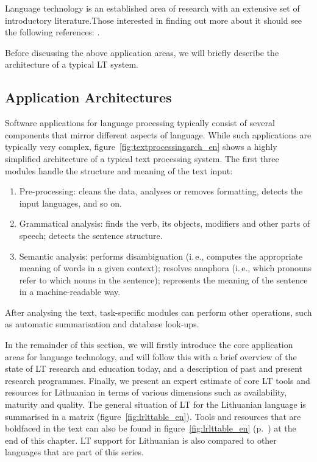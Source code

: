 \documentclass[]{../metanetpaper}
\begin{document}
\begin{multicols}{2}
Language technology is an established area of research with an extensive set of introductory literature.Those interested in finding out more about it should see the following references:  \cite{carstensen-etal1, jurafsky-martin01, manning-schuetze1, lt-world1, lt-survey1}.

Before discussing the above application areas, we will briefly describe the architecture of a typical LT system.

\subsection{Application Architectures}

Software applications for language processing typically consist of several components that mirror different aspects of language. While such applications are typically very complex, figure~\ref{fig:textprocessingarch_en} shows a highly simplified architecture of a typical text processing system. The first three modules handle the structure and meaning of the text input:

\begin{enumerate}
\item Pre-processing: cleans the data, analyses or removes formatting, detects the input languages, and so on.
\item Grammatical analysis: finds the verb, its objects, modifiers and other parts of speech; detects the sentence structure.
\item Semantic analysis: performs disambiguation (i.\,e., computes the appropriate meaning of words in a given context); resolves anaphora (i.\,e., which pronouns refer to which nouns in the sentence); represents the meaning of the sentence in a machine-readable way.
\end{enumerate}

After analysing the text, task-specific modules can perform other operations, such as automatic summarisation and database look-ups.

In the remainder of this section, we will firstly introduce the core application areas for language technology, and will follow this with a brief overview of the state of LT research and education today, and a description of past and present research programmes. Finally, we present an expert estimate of core LT tools and resources for Lithuanian in terms of various dimensions such as availability, maturity and quality. The general situation of LT for the Lithuanian language is summarised in a matrix (figure~\ref{fig:lrlttable_en}). Tools and resources that are boldfaced in the text can also be found in figure~\ref{fig:lrlttable_en} (p.~\pageref{fig:lrlttable_en}) at the end of this chapter. LT support for Lithuanian is also compared to other languages that are part of this series.


\end{multicols}
\end{document}
